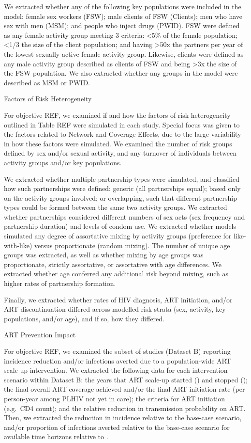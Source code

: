 We extracted whether any of the following key populations were included in the model:
female sex workers (FSW);
male clients of FSW (Clients);
men who have sex with men (MSM); and
people who inject drugs (PWID).
FSW were defined as any female activity group meeting 3 criteria:
{<5\%} of the female population;
{<1/3} the size of the client population; and
having {>50x} the partners per year of
the lowest sexually active female activity group.
Likewise, clients were defined as any male activity group
described as clients of FSW and being {>3x} the size of the FSW population.
We also extracted whether any groups in the model were described as MSM or PWID.

Factors of Risk Heterogeneity

For objective REF, we examined if and how
the factors of risk heterogeneity outlined in Table REF
were simulated in each study.
Special focus was given to the factors related to Network and Coverage Effects,
due to the large variability in how these factors were simulated.
We examined the number of risk groups defined by sex and/or sexual activity, and
any turnover of individuals between activity groups and/or key populations.

We extracted whether multiple partnership types were simulated,
and classified how such partnerships were defined:
generic (all partnerships equal);
based only on the activity groups involved;
or overlapping, such that different partnership types could be formed between the same two activity groups.
We extracted whether partnerships considered different
numbers of sex acts (sex frequency and partnership duration) and levels of condom use.
We extracted whether models simulated any degree of assortative mixing by activity groups
(preference for like-with-like) versus proportionate (random mixing). 
The number of unique age groups was extracted, as well as
whether mixing by age groups was
proportionate, strictly assortative, or assortative with age differences.
We extracted whether age conferred any additional risk beyond mixing,
such as higher rates of partnership formation.

Finally, we extracted whether rates of HIV diagnosis, ART initiation, and/or ART discontinuation
differed across modelled risk strata (sex, activity, key populations, and/or age),
and if so, how they differed.

ART Prevention Impact

For objective REF, we examined the subset of studies (Dataset B)
reporting incidence reduction and/or infections averted due to
a population-wide ART scale-up intervention.
We extracted the following data for each intervention scenario within Dataset B:
the years that ART scale-up started () and stopped ();
the final overall ART coverage achieved and/or
the final ART initiation rate (per person-year among PLHIV not yet in care);
the criteria for ART initiation (e.g.\ CD4 count);
and the relative reduction in transmission probability on ART.
Then, we extracted the
reduction in incidence relative to the base-case scenario, and/or
proportion of infections averted relative to the base-case scenario
for available time horizons relative to .


